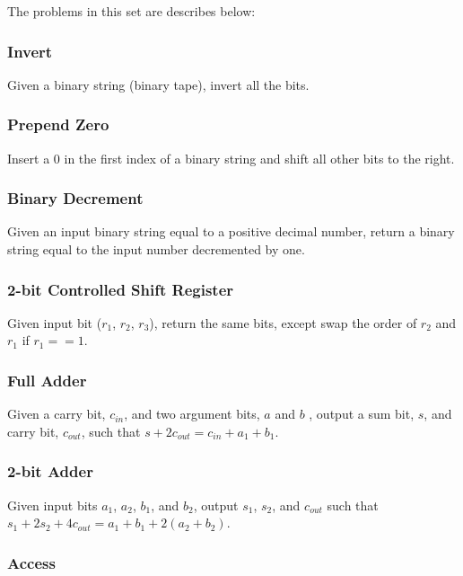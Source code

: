 The problems in this set are describes below:

\subsubsection{Invert}

Given a binary string (binary tape), invert all the bits.

\subsubsection{Prepend Zero}

Insert a $0$ in the first index of a binary string and shift all other bits to the right.

\subsubsection{Binary Decrement}

Given an input binary string equal to a positive decimal number, return a binary string equal to the input number decremented by one.

\subsubsection{2-bit Controlled Shift Register}

Given input bit ($r_1$, $r_2$, $r_3$), return the same bits, except swap the order of $r_2$ and $r_1$ if $r_1 == 1$.

\subsubsection{Full Adder}

Given a carry bit, $c_{in}$, and two argument bits, $a$ and $b$ , output a sum bit, $s$, and carry bit, $c_{out}$, such that  $s + 2c_{out} = c_{in} + a_1 + b_1$.

\subsubsection{2-bit Adder}

Given input bits $a_1$, $a_2$, $b_1$, and $b_2$, output $s_1$, $s_2$, and $c_{out}$ such that  $s_1 + 2s_2 + 4c_{out} = a_1 + b_1 + 2(a_2 + b_2)$.

\subsubsection{Access}

